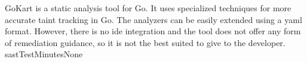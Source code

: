 {
\label{bc:gokart}
GoKart is a static analysis tool for Go.
It uses specialized techniques for more accurate taint tracking in Go.
The analyzers can be easily extended using a \gls{yaml} format.
However, there is no \gls{ide} integration and the tool does not offer any form of remediation guidance, so it is not the best suited to give to the developer.
}{\gls{sast}}{Test}{Minutes}{None}

